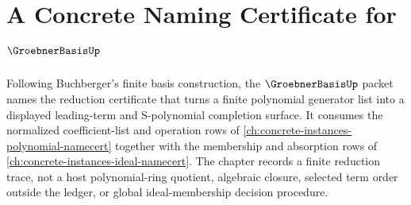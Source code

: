 \chapter{A Concrete Naming Certificate for $\GroebnerBasisUp$}
\label{ch:concrete-instances-groebner-basis-namecert}

Following Buchberger's finite basis construction, the $\GroebnerBasisUp$ packet names the reduction certificate that turns a finite polynomial generator list into a displayed leading-term and S-polynomial completion surface. It consumes the normalized coefficient-list and operation rows of \autoref{ch:concrete-instances-polynomial-namecert} together with the membership and absorption rows of \autoref{ch:concrete-instances-ideal-namecert}. The chapter records a finite reduction trace, not a host polynomial-ring quotient, algebraic closure, selected term order outside the ledger, or global ideal-membership decision procedure.


